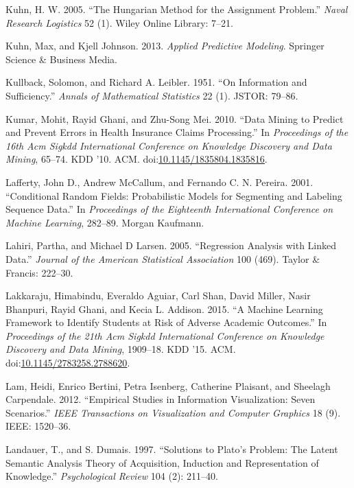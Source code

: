 \documentclass[]{krantz}
\begin{document}
\hypertarget{ref-kuhn2005hungarian}{}
Kuhn, H. W. 2005. ``The Hungarian Method for the Assignment Problem.''
\emph{Naval Research Logistics} 52 (1). Wiley Online Library: 7--21.

\hypertarget{ref-KuhnJohnson2013}{}
Kuhn, Max, and Kjell Johnson. 2013. \emph{Applied Predictive Modeling}.
Springer Science \& Business Media.

\hypertarget{ref-kullback1951information}{}
Kullback, Solomon, and Richard A. Leibler. 1951. ``On Information and
Sufficiency.'' \emph{Annals of Mathematical Statistics} 22 (1). JSTOR:
79--86.

\hypertarget{ref-Kumar2010}{}
Kumar, Mohit, Rayid Ghani, and Zhu-Song Mei. 2010. ``Data Mining to
Predict and Prevent Errors in Health Insurance Claims Processing.'' In
\emph{Proceedings of the 16th Acm Sigkdd International Conference on
Knowledge Discovery and Data Mining}, 65--74. KDD '10. ACM.
doi:\href{https://doi.org/10.1145/1835804.1835816}{10.1145/1835804.1835816}.

\hypertarget{ref-lafferty-01}{}
Lafferty, John D., Andrew McCallum, and Fernando C. N. Pereira. 2001.
``Conditional Random Fields: Probabilistic Models for Segmenting and
Labeling Sequence Data.'' In \emph{Proceedings of the Eighteenth
International Conference on Machine Learning}, 282--89. Morgan Kaufmann.

\hypertarget{ref-lahiri2005regression}{}
Lahiri, Partha, and Michael D Larsen. 2005. ``Regression Analysis with
Linked Data.'' \emph{Journal of the American Statistical Association}
100 (469). Taylor \& Francis: 222--30.

\hypertarget{ref-Lakkaraju2015}{}
Lakkaraju, Himabindu, Everaldo Aguiar, Carl Shan, David Miller, Nasir
Bhanpuri, Rayid Ghani, and Kecia L. Addison. 2015. ``A Machine Learning
Framework to Identify Students at Risk of Adverse Academic Outcomes.''
In \emph{Proceedings of the 21th Acm Sigkdd International Conference on
Knowledge Discovery and Data Mining}, 1909--18. KDD '15. ACM.
doi:\href{https://doi.org/10.1145/2783258.2788620}{10.1145/2783258.2788620}.

\hypertarget{ref-lam2012empirical}{}
Lam, Heidi, Enrico Bertini, Petra Isenberg, Catherine Plaisant, and
Sheelagh Carpendale. 2012. ``Empirical Studies in Information
Visualization: Seven Scenarios.'' \emph{IEEE Transactions on
Visualization and Computer Graphics} 18 (9). IEEE: 1520--36.

\hypertarget{ref-landauer-97}{}
Landauer, T., and S. Dumais. 1997. ``Solutions to Plato's Problem: The
Latent Semantic Analysis Theory of Acquisition, Induction and
Representation of Knowledge.'' \emph{Psychological Review} 104 (2):
211--40.
\end{document}
